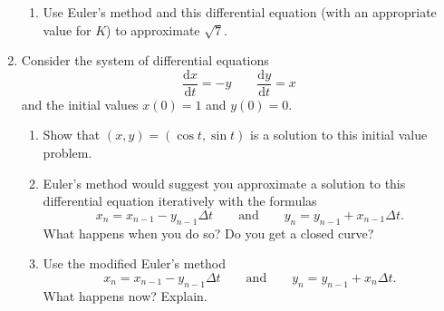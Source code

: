 \documentclass[letter]{article}
\renewcommand{\d}{\mathrm{d}}
\begin{document}
\begin{enumerate}
\begin{enumerate}
			\item Use Euler's method and this differential equation (with an appropriate value for $K$) to approximate
				$\sqrt{7}$.
		\end{enumerate}

		\item Consider the system of differential equations
			\[
				\frac{\d x}{\d t} = -y\qquad
				\frac{\d y}{\d t} = x
			\]
			and the initial values $x(0)=1$ and $y(0)=0$.
		\begin{enumerate}
			\item Show that $(x,y) = (\cos t, \sin t)$ is a solution to this initial value problem.
			\item Euler's method would suggest you approximate a solution to this differential equation
				iteratively with the formulas 
				\[
					x_n=x_{n-1}-y_{n-1}\Delta t\qquad\text{and}\qquad
					y_n = y_{n-1}+x_{n-1}\Delta t.
				\]
				What happens when you do so?  Do you get a closed curve?
			\item Use the modified Euler's method
				\[
					x_n=x_{n-1}-y_{n-1}\Delta t\qquad\text{and}\qquad
					y_n = y_{n-1}+x_{n}\Delta t.
				\]
				What happens now?  Explain.
		\end{enumerate}

	\end{enumerate}
\end{document}
